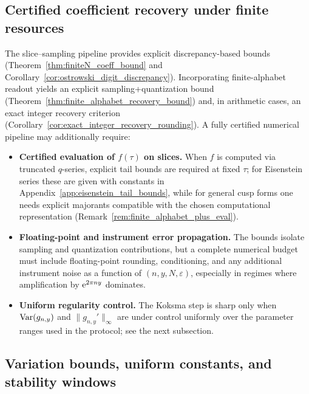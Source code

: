 \subsection{Certified coefficient recovery under finite resources}

The slice--sampling pipeline provides explicit discrepancy-based bounds (Theorem~\ref{thm:finiteN_coeff_bound} and Corollary~\ref{cor:ostrowski_digit_discrepancy}). Incorporating finite-alphabet readout yields an explicit sampling+quantization bound (Theorem~\ref{thm:finite_alphabet_recovery_bound}) and, in arithmetic cases, an exact integer recovery criterion (Corollary~\ref{cor:exact_integer_recovery_rounding}). A fully certified numerical pipeline may additionally require:
\begin{itemize}
\item \textbf{Certified evaluation of $f(\tau)$ on slices.} When $f$ is computed via truncated $q$-series, explicit tail bounds are required at fixed $\tau$; for Eisenstein series these are given with constants in Appendix~\ref{app:eisenstein_tail_bounds}, while for general cusp forms one needs explicit majorants compatible with the chosen computational representation (Remark~\ref{rem:finite_alphabet_plus_eval}).
\item \textbf{Floating-point and instrument error propagation.} The bounds isolate sampling and quantization contributions, but a complete numerical budget must include floating-point rounding, conditioning, and any additional instrument noise as a function of $(n,y,N,\varepsilon)$, especially in regimes where amplification by $\mathrm{e}^{2\pi n y}$ dominates.
\item \textbf{Uniform regularity control.} The Koksma step is sharp only when $\mathrm{Var}(g_{n,y})$ and $\|g_{n,y}'\|_\infty$ are under control uniformly over the parameter ranges used in the protocol; see the next subsection.
\end{itemize}

\subsection{Variation bounds, uniform constants, and stability windows}
\label{app:limitations_variation}

